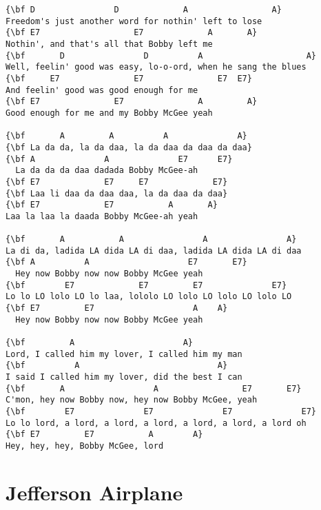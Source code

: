 \documentclass[a4paper]{article}
\begin{document}
\begin{Verbatim}[commandchars=\\\{\}]
{\bf D                D             A                 A}
Freedom's just another word for nothin' left to lose
{\bf E7                   E7             A       A}
Nothin', and that's all that Bobby left me
{\bf       D                D          A                     A}
Well, feelin' good was easy, lo-o-ord, when he sang the blues
{\bf     E7               E7               E7  E7}
And feelin' good was good enough for me
{\bf E7               E7               A         A}
Good enough for me and my Bobby McGee yeah

{\bf       A         A          A              A}
{\bf La da da, la da daa, la da daa da daa da daa}
{\bf A              A              E7      E7}
  La da da da daa dadada Bobby McGee-ah
{\bf E7             E7     E7             E7}
{\bf Laa li daa da daa daa, la da daa da daa}
{\bf E7             E7           A       A}
Laa la laa la daada Bobby McGee-ah yeah

{\bf       A           A                A                A}
La di da, ladida LA dida LA di daa, ladida LA dida LA di daa
{\bf A          A                    E7       E7}
  Hey now Bobby now now Bobby McGee yeah
{\bf        E7             E7         E7              E7}
Lo lo LO lolo LO lo laa, lololo LO lolo LO lolo LO lolo LO 
{\bf E7         E7                    A    A}
  Hey now Bobby now now Bobby McGee yeah

{\bf         A                      A}
Lord, I called him my lover, I called him my man
{\bf          A                            A}
I said I called him my lover, did the best I can
{\bf       A                  A                 E7       E7}
C'mon, hey now Bobby now, hey now Bobby McGee, yeah
{\bf        E7              E7              E7              E7}
Lo lo lord, a lord, a lord, a lord, a lord, a lord, a lord oh
{\bf E7         E7           A        A}
Hey, hey, hey, Bobby McGee, lord
\end{Verbatim}
\newpage
\section{Jefferson Airplane} %
\label{sec:Jefferson Airplane}
\end{document}
